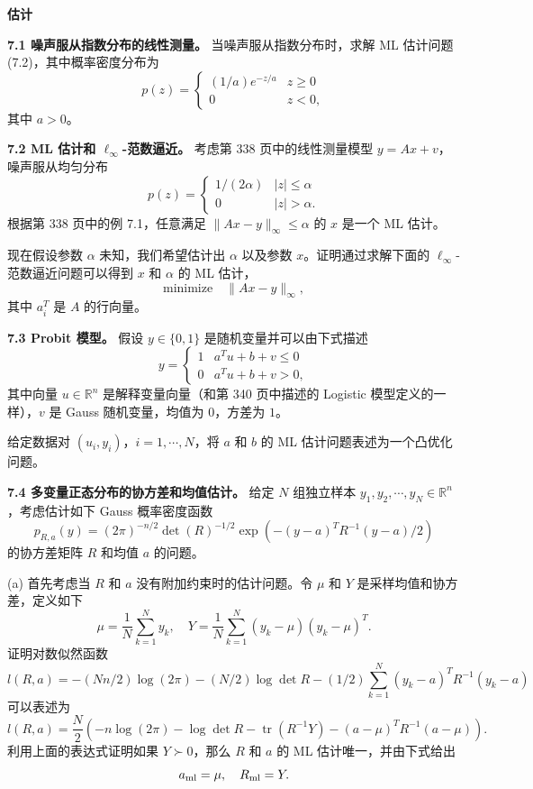 \documentclass[UTF8, 12pt, fontset=fandol, oneside]{ctexart}
\begin{document}
\noindent\textbf{估计}

\noindent\textbf{7.1 噪声服从指数分布的线性测量。}\quad
当噪声服从指数分布时，求解 ML 估计问题 (7.2)，其中概率密度分布为
\[
p(z)=
\begin{cases}
(1/a)e^{-z/a} & z\geq 0\\
0 & z<0,
\end{cases}
\]
其中 $a>0$。

\noindent\textbf{7.2 ML 估计和 $\ell_\infty$-范数逼近。}\quad
考虑第 338 页中的线性测量模型 $y=Ax+v$，噪声服从均匀分布
\[
p(z)=
\begin{cases}
1/(2\alpha) & |z|\leq \alpha\\
0 & |z|>\alpha.
\end{cases}
\]
根据第 338 页中的例 7.1，任意满足 $\|Ax-y\|_\infty\leq \alpha$ 的 $x$ 是一个 ML 估计。

现在假设参数 $\alpha$ 未知，我们希望估计出 $\alpha$ 以及参数 $x$。证明通过求解下面的 $\ell_\infty$-范数逼近问题可以得到 $x$ 和 $\alpha$ 的 ML 估计，
\[
\text{minimize}\quad \|Ax-y\|_\infty,
\]
其中 $a_i^T$ 是 $A$ 的行向量。

\noindent\textbf{7.3 Probit 模型。}\quad
假设 $y\in\{0,1\}$ 是随机变量并可以由下式描述
\[
y=
\begin{cases}
1 & a^Tu+b+v\leq 0\\
0 & a^Tu+b+v>0,
\end{cases}
\]
其中向量 $u\in\mathbb{R}^n$ 是解释变量向量（和第 340 页中描述的 Logistic 模型定义的一样），$v$ 是 Gauss 随机变量，均值为 $0$，方差为 $1$。

给定数据对 $(u_i,y_i)$，$i=1,\cdots,N$，将 $a$ 和 $b$ 的 ML 估计问题表述为一个凸优化问题。

\noindent\textbf{7.4 多变量正态分布的协方差和均值估计。}\quad
给定 $N$ 组独立样本 $y_1,y_2,\cdots,y_N\in\mathbb{R}^n$，考虑估计如下 Gauss 概率密度函数
\[
p_{R,a}(y)=(2\pi)^{-n/2}\det(R)^{-1/2}\exp\left(-(y-a)^TR^{-1}(y-a)/2\right)
\]
的协方差矩阵 $R$ 和均值 $a$ 的问题。

(a) 首先考虑当 $R$ 和 $a$ 没有附加约束时的估计问题。令 $\mu$ 和 $Y$ 是采样均值和协方差，定义如下
\[
\mu=\frac{1}{N}\sum_{k=1}^N y_k,\quad
Y=\frac{1}{N}\sum_{k=1}^N(y_k-\mu)(y_k-\mu)^T.
\]
证明对数似然函数
\[
l(R,a)=-(Nn/2)\log(2\pi)-(N/2)\log\det R-(1/2)\sum_{k=1}^N(y_k-a)^TR^{-1}(y_k-a)
\]
可以表述为
\[
l(R,a)=\frac{N}{2}\left(-n\log(2\pi)-\log\det R-\operatorname{tr}(R^{-1}Y)-(a-\mu)^TR^{-1}(a-\mu)\right).
\]
利用上面的表达式证明如果 $Y\succ 0$，那么 $R$ 和 $a$ 的 ML 估计唯一，并由下式给出
\[
a_{\rm ml}=\mu,\quad R_{\rm ml}=Y.
\]
\end{document}

